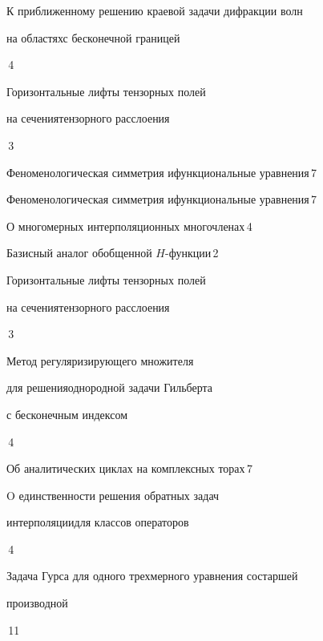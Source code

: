 

{К приближенному решению краевой задачи дифракции волн


на областях\newline с бесконечной границей}{\No\,4}




{Горизонтальные лифты тензорных полей


на сечения\newline тензорного расслоения}{\No\,3}




{Феноменологическая симметрия и\newline функциональные уравнения}{\No\,7}




{Феноменологическая симметрия и\newline функциональные уравнения}{\No\,7}




{О многомерных интерполяционных многочленах}{\No\,4}




{Базисный аналог обобщенной $H$-функции}{\No\,2}




{Горизонтальные лифты тензорных полей


на сечения\newline тензорного расслоения}{\No\,3}




{Метод регуляризирующего множителя


для решения\newline однородной задачи Гильберта


с бесконечным индексом}{\No\,4}




{Об аналитических циклах на комплексных торах}{\No\,7}




{O единственности решения обратных задач


интерполяции\newline для классов операторов}{\No\,4}




{Задача Гурса для одного трехмерного уравнения со\newline старшей 


производной}{\No\,11}


